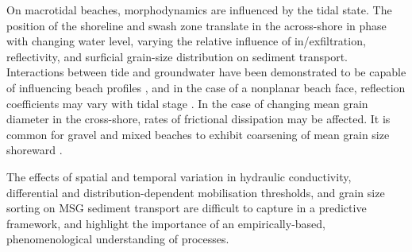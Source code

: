 On macrotidal beaches, morphodynamics are influenced by the tidal state. The position of the shoreline and swash zone translate in the across-shore in phase with changing water level, varying the relative influence of in/exfiltration, reflectivity, and surficial grain-size distribution on sediment transport. Interactions between tide and groundwater have been demonstrated to be capable of influencing beach profiles \citep[e.g.,][]{Turner1995}, and in the case of a nonplanar beach face, reflection coefficients may vary with tidal stage \citep{Davidson_etal1994}. In the case of changing mean grain diameter in the cross-shore, rates of frictional dissipation may be affected. It is common for gravel and mixed beaches to exhibit coarsening of mean grain size shoreward \citep{Mason_Coates2001}. 

The effects of spatial and temporal variation in hydraulic conductivity, differential and distribution-dependent mobilisation thresholds, and grain size sorting on MSG sediment transport are difficult to capture in a predictive framework, and highlight the importance of an empirically-based, phenomenological understanding of processes. 





